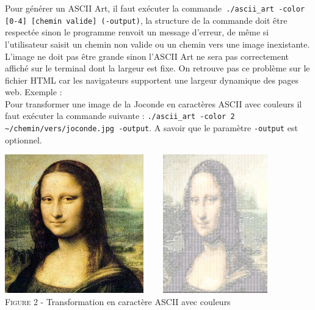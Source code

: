 \documentclass{article}
\begin{document}
Pour générer un ASCII Art, il faut exécuter la commande\verb# ./ascii_art -color [0-4] [chemin valide] (-output)#, la structure de la commande doit être respectée sinon le programme renvoit un message d'erreur, de même si l'utilisateur saisit un chemin non valide ou un chemin vers une image inexistante. \\
L'image ne doit pas être grande sinon l'ASCII Art ne sera pas correctement affiché sur le terminal dont la largeur est fixe. On retrouve pas ce problème sur le fichier HTML car les navigateurs supportent une largeur dynamique des pages web. 
Exemple : \\
Pour transformer une image de la Joconde en caractères ASCII avec couleurs il faut exécuter la commande suivante : \verb#./ascii_art -color 2 ~/chemin/vers/joconde.jpg -output#. A savoir que le paramètre \verb#-output# est optionnel. \\
\begin{center}
\centering
\includegraphics[width=6cm,height=6cm]{mona.jpg}  
\includegraphics[width=6cm,height=6cm]{monaoutputed.png}
\\ %
\textsc{Figure 2} - Transformation en caractère ASCII avec couleurs
\end{center}
\end{document}
